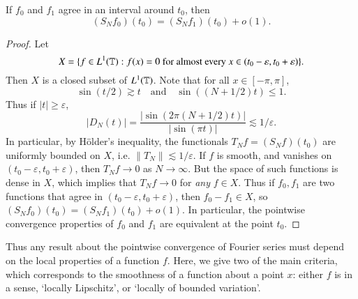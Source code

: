 \begin{lemma}
    If $f_0$ and $f_1$ agree in an interval around $t_0$, then
    \[ (S_N f_0)(t_0) = (S_N f_1)(t_0) + o(1). \]
\end{lemma}
\begin{proof}
    Let
    \[ X = \{ f \in L^1(\operatorname{\mathbb{T}}) : f(x) = 0\ \text{for almost every $x \in (t_0 - \varepsilon, t_0 + \varepsilon$)} \}. \]
    Then $X$ is a closed subset of $L^1(\operatorname{\mathbb{T}})$. Note that for all $x \in [-\pi,\pi]$,
    \[ \sin(t/2) \gtrsim t \quad\text{and}\quad \sin((N+1/2)t) \leq 1. \]
    Thus if $|t| \geq \varepsilon$,
    \[ |D_N(t)| = \frac{|\sin(2 \pi (N+1/2)t)|}{|\sin(\pi t)|} \lesssim 1/\varepsilon. \]
    In particular, by H\"{o}lder's inequality, the functionals $T_Nf = (S_N f)(t_0)$ are uniformly bounded on $X$, i.e. $\| T_N \| \lesssim 1/\varepsilon$. If $f$ is smooth, and vanishes on $(t_0 - \varepsilon, t_0 + \varepsilon)$, then $T_N f \to 0$ as $N \to \infty$. But the space of such functions is dense in $X$, which implies that $T_N f \to 0$ for \emph{any} $f \in X$. Thus if $f_0, f_1$ are two functions that agree in $(t_0 - \varepsilon, t_0 + \varepsilon)$, then $f_0 - f_1 \in X$, so $(S_N f_0)(t_0) = (S_N f_1)(t_0) + o(1)$. In particular, the pointwise convergence properties of $f_0$ and $f_1$ are equivalent at the point $t_0$.
\end{proof}

Thus any result about the pointwise convergence of Fourier series must depend on the local properties of a function $f$. Here, we give two of the main criteria, which corresponds to the smoothness of a function about a point $x$: either $f$ is in a sense, `locally Lipschitz', or `locally of bounded variation'.

